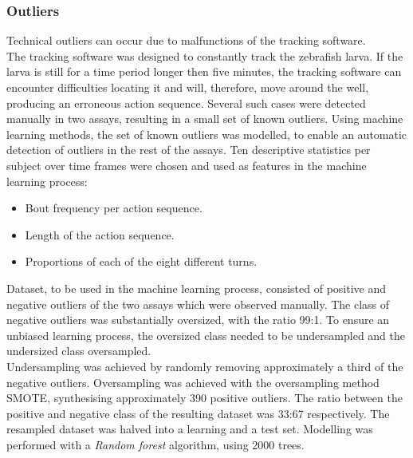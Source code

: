 \documentclass[a4paper,12pt]{article}
\begin{document}
\subsubsection{Outliers}
Technical outliers can occur due to malfunctions of the tracking software. \\The tracking software was designed to constantly track the zebrafish larva. If the larva is still for a time period longer then five minutes, the tracking software can encounter difficulties locating it and will, therefore, move around the well, producing an erroneous action sequence. Several such cases were detected manually in two assays, resulting in a small set of known outliers.
Using machine learning methods, the set of known outliers was modelled, to enable an automatic detection of outliers in the rest of the assays.
Ten descriptive statistics per subject over time frames were chosen and used as features in the machine learning process:
\begin{itemize}
\item Bout frequency per action sequence.
\item Length of the action sequence.
\item Proportions of each of the eight different turns. 
\end{itemize}
Dataset, to be used in the machine learning process, consisted of positive and negative outliers of the two assays which were observed manually. The class of negative outliers was substantially oversized, with the ratio 99:1. To ensure an unbiased learning process, the oversized class needed to be undersampled and the undersized class oversampled. \\Undersampling was achieved by randomly removing approximately a third of the negative outliers. Oversampling was achieved with the oversampling method SMOTE\cite{ref35}, synthesising approximately 390 positive outliers. The ratio between the positive and negative class of the resulting dataset was 33:67 respectively. The resampled dataset was halved into a learning and a test set.
Modelling was performed with a \textit{Random forest} algorithm\cite{ref36}, using 2000 trees.
\end{document}
